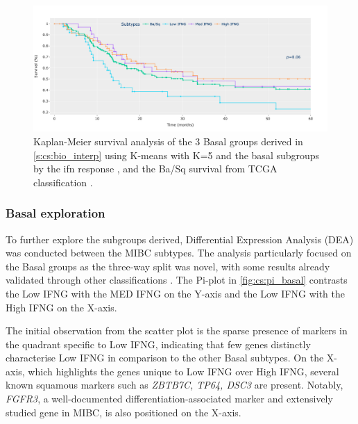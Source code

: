 \begin{figure}[!htb]    
    \centering
    \includegraphics[width=1.0\textwidth,keepaspectratio]{Sections/ClusteringAnalysis/Resources/discussion/survival_basal.png}
    \caption{Kaplan-Meier survival analysis of the 3 Basal groups derived in \cref{s:cs:bio_interp} using K-means with K=5 and the basal subgroups by the \acrshort{ifn} response \citet{Baker2022-bj}, and the Ba/Sq survival from TCGA classification \citet{Robertson2017-mg}.}
    \label{fig:cs:basal_survival}
\end{figure}

\subsubsection{Basal exploration}

To further explore the subgroups derived, Differential Expression Analysis (DEA) was conducted between the MIBC subtypes. The analysis particularly focused on the Basal groups as the three-way split was novel, with some results already validated through other classifications \citet{Baker2022-bj,Marzouka2018-ge}. The Pi-plot in \cref{fig:cs:pi_basal} contrasts the Low IFNG with the MED IFNG on the Y-axis and the Low IFNG with the High IFNG on the X-axis.

The initial observation from the scatter plot is the sparse presence of markers in the quadrant specific to Low IFNG, indicating that few genes distinctly characterise Low IFNG in comparison to the other Basal subtypes. On the X-axis, which highlights the genes unique to Low IFNG over High IFNG, several known squamous markers such as \textit{ZBTB7C, TP64, DSC3} are present. Notably, \textit{FGFR3}, a well-documented differentiation-associated marker and extensively studied gene in MIBC, is also positioned on the X-axis.


